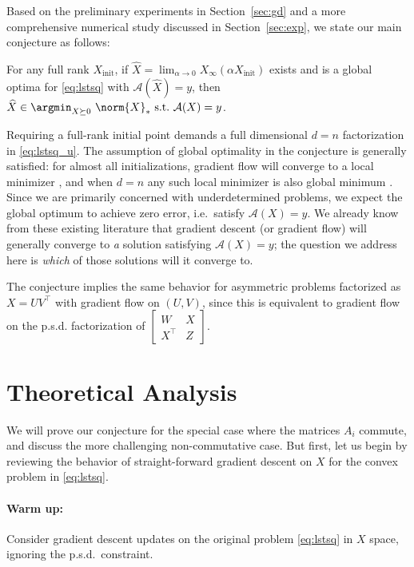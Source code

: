 Based on the preliminary experiments in Section~\ref{sec:gd} and a more comprehensive numerical study discussed in Section~\ref{sec:exp},
we state our main conjecture as follows:

\begin{conjecture*}
  For any full rank $X_{\textrm{init}}$, if $\widehat{X}=\lim_{\alpha\to 0}
  X_\infty(\alpha X_{\textrm{init}})$ exists and is a global optima for
  \eqref{eq:lstsq} with $\mathcal{A}(\widehat{X})=y$, then $\widehat{X} \in
  \argmin_{X\succeq 0}\ \norm{X}_*\ \textrm{s.t.}\
  \mathcal{A}(X) = y$.
\end{conjecture*}

Requiring a full-rank initial point demands a full dimensional $d=n$ factorization in \eqref{eq:lstsq_u}.  The assumption of global optimality in the conjecture is generally satisfied: for almost all initializations, gradient flow will converge to a local minimizer \citep{lee2016gradient}, and when $d=n$ any such local minimizer is also global minimum \citep{journee2010low}.  Since we are primarily concerned with underdetermined problems, we expect the global optimum to achieve zero error, i.e.~satisfy $\mathcal{A}(X)=y$.  We already know from these existing literature that gradient descent (or gradient flow) will generally converge to \emph{a} solution satisfying $\mathcal{A}(X)=y$; the question we address here is \emph{which} of those solutions will it converge to.  

The conjecture implies the same behavior for asymmetric problems factorized as $X = UV^\top$ with gradient flow on $(U,V)$, since this is equivalent to gradient flow on the p.s.d. factorization of $\left[

\begin{smallmatrix}W&X\\X^\top&Z\end{smallmatrix}

\right]$.

\section{Theoretical Analysis}\label{sec:theory}

We will prove our conjecture for the special case where the matrices $A_i$ commute, and discuss the more challenging non-commutative case. But first, let us begin by reviewing the behavior of straight-forward gradient descent on $X$ for the convex problem in \eqref{eq:lstsq}.

\paragraph{Warm up: } Consider gradient descent updates on the original problem \eqref{eq:lstsq} in $X$ space, ignoring the p.s.d.~constraint.

